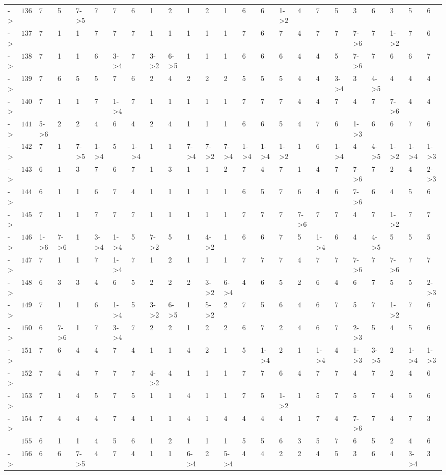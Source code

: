 \documentclass[6pt]{article}
\begin{document}
\begin{landscape}
{\begin{longtable}{lrllllllllllllllllllllll}
\newpage
-\textgreater &$136$&7&5&7-\textgreater 5&7&7&6&1&2&1&2&1&6&6&1-\textgreater 2&4&7&5&3&6&3&5&6\tabularnewline
-\textgreater &$137$&7&1&1&7&7&7&1&1&1&1&1&7&6&7&4&7&7&7-\textgreater 6&7&1-\textgreater 2&7&6\tabularnewline
-\textgreater &$138$&7&1&1&6&3-\textgreater 4&7&3-\textgreater 2&6-\textgreater 5&1&1&1&6&6&6&4&4&5&7-\textgreater 6&7&6&6&7\tabularnewline
-\textgreater &$139$&7&6&5&5&7&6&2&4&2&2&2&5&5&5&4&4&3-\textgreater 4&3&4-\textgreater 5&4&4&4\tabularnewline
-\textgreater &$140$&7&1&1&7&1-\textgreater 4&7&1&1&1&1&1&7&7&7&4&4&7&4&7&7-\textgreater 6&4&4\tabularnewline
-\textgreater &$141$&5-\textgreater 6&2&2&4&6&4&2&4&1&1&1&6&6&5&4&7&6&1-\textgreater 3&6&6&7&6\tabularnewline
-\textgreater &$142$&7&1&7-\textgreater 5&1-\textgreater 4&5&1-\textgreater 4&1&1&7-\textgreater 4&7-\textgreater 2&7-\textgreater 4&1-\textgreater 4&1-\textgreater 4&1-\textgreater 2&1&6&1-\textgreater 4&4&4-\textgreater 5&1-\textgreater 2&1-\textgreater 4&1-\textgreater 3\tabularnewline
-\textgreater &$143$&6&1&3&7&6&7&1&3&1&1&2&7&4&7&1&4&7&7-\textgreater 6&7&2&4&2-\textgreater 3\tabularnewline
-\textgreater &$144$&6&1&1&6&7&4&1&1&1&1&1&6&5&7&6&4&6&7-\textgreater 6&6&4&5&6\tabularnewline
-\textgreater &$145$&7&1&1&7&7&7&1&1&1&1&1&7&7&7&7-\textgreater 6&7&7&4&7&1-\textgreater 2&7&7\tabularnewline
-\textgreater &$146$&1-\textgreater 6&7-\textgreater 6&1&3-\textgreater 4&1-\textgreater 4&5&7-\textgreater 2&5&1&4-\textgreater 2&1&6&6&7&5&1-\textgreater 4&6&4&4-\textgreater 5&5&5&5\tabularnewline
-\textgreater &$147$&7&1&1&7&1-\textgreater 4&7&1&2&1&1&1&7&7&7&4&7&7&7-\textgreater 6&7&7-\textgreater 6&7&7\tabularnewline
-\textgreater &$148$&6&3&3&4&6&5&2&2&2&3-\textgreater 2&6-\textgreater 4&4&6&5&2&6&4&6&7&5&5&2-\textgreater 3\tabularnewline
-\textgreater &$149$&7&1&1&6&1-\textgreater 4&5&3-\textgreater 2&6-\textgreater 5&1&5-\textgreater 2&2&7&5&6&4&6&7&5&7&1-\textgreater 2&7&6\tabularnewline
-\textgreater &$150$&6&7-\textgreater 6&1&7&3-\textgreater 4&7&2&2&1&2&2&6&7&2&4&6&7&2-\textgreater 3&5&4&5&6\tabularnewline
-\textgreater &$151$&7&6&4&4&7&4&1&1&4&2&1&5&1-\textgreater 4&2&1&1-\textgreater 4&4&1-\textgreater 3&3-\textgreater 5&2&1-\textgreater 4&1-\textgreater 3\tabularnewline
-\textgreater &$152$&7&4&4&7&7&7&4-\textgreater 2&4&1&1&1&7&7&6&4&7&7&4&7&2&4&6\tabularnewline
-\textgreater &$153$&7&1&4&5&7&5&1&1&4&1&1&7&5&1-\textgreater 2&1&5&7&5&7&4&5&6\tabularnewline
-\textgreater &$154$&7&4&4&4&7&4&1&1&4&1&4&4&4&4&1&7&4&7-\textgreater 6&7&4&7&3\tabularnewline
&$155$&6&1&1&4&5&6&1&2&1&1&1&5&5&6&3&5&7&6&5&2&4&6\tabularnewline
-\textgreater &$156$&6&6&7-\textgreater 5&4&7&4&1&1&6-\textgreater 4&2&5-\textgreater 4&4&4&2&2&4&5&3&6&4&3-\textgreater 4&3\tabularnewline

\end{longtable}}
\end{landscape}
\end{document}
